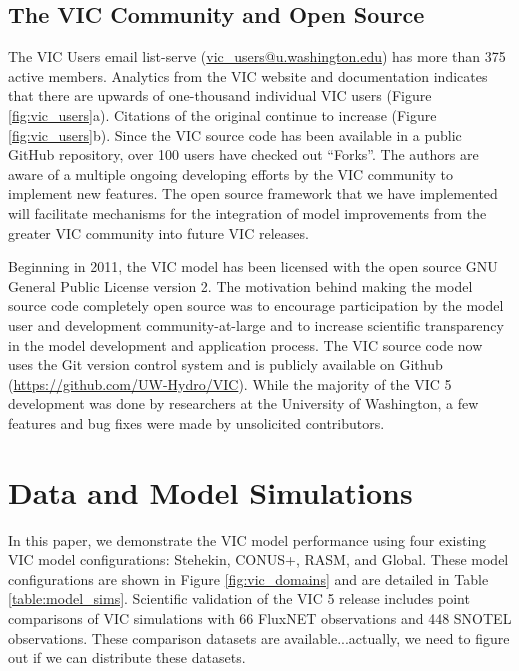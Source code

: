 \documentclass[gmd, manuscript]{copernicus}
\begin{document}
  \subsection{The VIC Community and Open Source}
    \label{sec:vic_community}
    The VIC Users email list-serve (\url{vic_users@u.washington.edu}) has more than 375 active members.
    Analytics from the VIC website and documentation indicates that there are upwards of one-thousand individual VIC users (Figure \ref{fig:vic_users}a).
    Citations of the original \citep{Liang_1994} continue to increase (Figure \ref{fig:vic_users}b).
    Since the VIC source code has been available in a public GitHub repository, over 100 users have checked out ``Forks''.
    The authors are aware of a multiple ongoing developing efforts by the VIC community to implement new features.
    The open source framework that we have implemented will facilitate mechanisms for the integration of model improvements from the greater VIC community into future VIC releases.

    Beginning in 2011, the VIC model has been licensed with the open source GNU General Public License version 2.
    The motivation behind making the model source code completely open source was to encourage participation by the model user and development community-at-large and to increase scientific transparency in the model development and application process.
    The VIC source code now uses the Git version control system and is publicly available on Github (\url{https://github.com/UW-Hydro/VIC}).
    While the majority of the VIC 5 development was done by researchers at the University of Washington, a few features and bug fixes were made by unsolicited contributors.

\section{Data and Model Simulations}
  \label{sec:data_and_sims}
  In this paper, we demonstrate the VIC model performance using four existing VIC model configurations: Stehekin, CONUS+, RASM, and Global.
  These model configurations are shown in Figure \ref{fig:vic_domains} and are detailed in Table \ref{table:model_sims}.
  Scientific validation of the VIC 5 release includes point comparisons of VIC simulations with 66 FluxNET observations and 448 SNOTEL observations.
  These comparison datasets are available...actually, we need to figure out if we can distribute these datasets.
\end{document}
